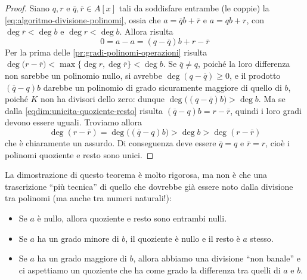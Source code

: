 \begin{proof}
	Siano $q,r$ e $\overline{q},\overline{r}\in A[x]$ tali da soddisfare entrambe (le coppie) la \eqref{eq:algoritmo-divisione-polinomi}, ossia che $a=\overline{q}b+\overline{r}$ e $a=qb+r$, con $\deg\overline{r}<\deg b$ e $\deg r<\deg b$.
	Allora risulta
	\begin{equation}
		0=a-a=(q-\overline{q})b+r-\overline{r}
		\label{eqdim:unicita-quoziente-resto}
	\end{equation}
	Per la prima delle \ref{pr:gradi-polinomi-operazioni} risulta $\deg(r-\overline{r}\big)<\max\{\deg r,\deg\overline{r}\}<\deg b$.
	Se $\overline{q}\neq q$, poich\'e la loro differenza non sarebbe un polinomio nullo, si avrebbe $\deg(q-\overline{q})\ge 0$, e il prodotto $(\overline{q}-q)b$ darebbe un polinomio di grado sicuramente maggiore di quello di $b$, poiché $K$ non ha divisori dello zero: dunque $\deg\big((q-\overline{q})b\big)>\deg b$.
	Ma se dalla \eqref{eqdim:unicita-quoziente-resto} risulta $(\overline{q}-q)b=r-\overline{r}$, quindi i loro gradi devono essere uguali.
	Troviamo allora
	\begin{equation}
		\deg(r-\overline{r})=\deg\big((\overline{q}-q)b\big)>\deg b>\deg(r-\overline{r})
	\end{equation}
	che è chiaramente un assurdo.
	Di conseguenza deve essere $\overline{q}=q$ e $\overline{r}=r$, cioè i polinomi quoziente e resto sono unici.
\end{proof}
La dimostrazione di questo teorema è molto rigorosa, ma non è che una trascrizione ``più tecnica'' di quello che dovrebbe già essere noto dalla divisione tra polinomi (ma anche tra numeri naturali!):
\begin{itemize}
	\item Se $a$ è nullo, allora quoziente e resto sono entrambi nulli.
	\item Se $a$ ha un grado minore di $b$, il quoziente è nullo e il resto è $a$ stesso.
	\item Se $a$ ha un grado maggiore di $b$, allora abbiamo una divisione ``non banale'' e ci aspettiamo un quoziente che ha come grado la differenza tra quelli di $a$ e $b$.
\end{itemize}

